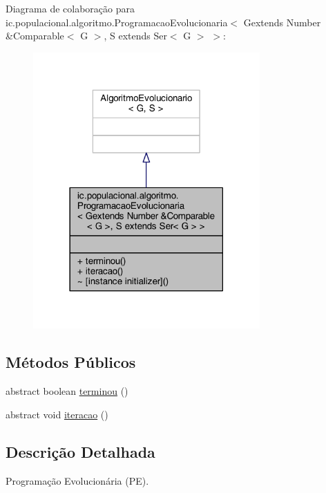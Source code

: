 Diagrama de colaboração para ic.\-populacional.\-algoritmo.\-Programacao\-Evolucionaria$<$ Gextends Number \&Comparable$<$ G $>$, S extends Ser$<$ G $>$ $>$\-:\nopagebreak
\begin{figure}[H]
\begin{center}
\leavevmode
\includegraphics[width=246pt]{classic_1_1populacional_1_1algoritmo_1_1_programacao_evolucionaria_3_01_gextends_01_number_01_6_0ad178c0f64e5dfe40b6a5cbf5b5ac60}
\end{center}
\end{figure}
\subsection*{Métodos Públicos}
\begin{DoxyCompactItemize}
\item 
abstract boolean \hyperlink{classic_1_1populacional_1_1algoritmo_1_1_programacao_evolucionaria_3_01_gextends_01_number_01_6_8364919866d606ef485dd5624b0253b0_aff5f3fa8e90ae9ebc93af1c97b93f34a}{terminou} ()
\item 
abstract void \hyperlink{classic_1_1populacional_1_1algoritmo_1_1_programacao_evolucionaria_3_01_gextends_01_number_01_6_8364919866d606ef485dd5624b0253b0_a557795593db3933d9f07b6be229704d3}{iteracao} ()
\end{DoxyCompactItemize}


\subsection{Descrição Detalhada}
Programação Evolucionária (P\-E). 

